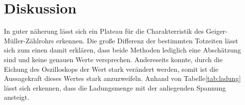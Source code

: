 \section{Diskussion}
\label{sec:Diskussion}
In guter näherung lässt sich ein Plateau für die Charakterristik des Geiger-Müller-Zählrohrs erkennen.
Die große Differenz der bestimmten Totzeiten lässt sich zum einen damit erklären, dass beide Methoden lediglich eine Abschätzung sind und keine genauen Werte versprechen.
Andereseits konnte, durch die Eichung des Oszilloskops der Wert stark verändert werden, somit ist die Aussagekraft dieses Wertes stark anzuzweifeln.
Anhand von Tabelle\ref{tab:ladung} lässt sich erkennen, dass die Ladungsmenge mit der anliegenden Spannung ansteigt.
 
